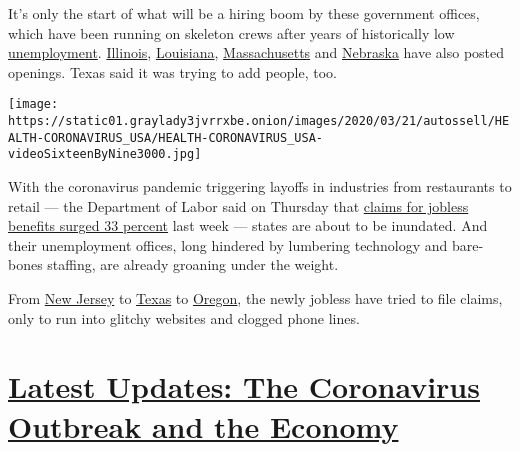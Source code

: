 It's only the start of what will be a hiring boom by these government
offices, which have been running on skeleton crews after years of
historically low
\href{https://www.nytimes3xbfgragh.onion/2020/04/03/upshot/coronavirus-jobless-rate-great-depression.html}{unemployment}.
\href{https://www.linkedin.com/jobs/view/1781957964/?eBP=NotAvailableFromVoyagerAPI\&refId=a42318c2-4f6f-4ec4-9d40-6d8e7c734cb3\&trk=d_flagship3_search_srp_jobs}{Illinois},
\href{https://www.linkedin.com/jobs/view/1781925553/?eBP=NotAvailableFromVoyagerAPI\&refId=f4bff901-d957-4d06-b4e1-ffeb31a8d5fd\&trk=d_flagship3_search_srp_jobs}{Louisiana},
\href{https://www.linkedin.com/jobs/view/1786824548/?eBP=NotAvailableFromVoyagerAPI\&refId=a42318c2-4f6f-4ec4-9d40-6d8e7c734cb3\&trk=d_flagship3_search_srp_jobs}{Massachusetts}
and
\href{https://www.linkedin.com/jobs/view/1780250882/?eBP=NotAvailableFromVoyagerAPI\&refId=eb500c71-3647-4c52-a69a-4f6c5a6bcde1\&trk=d_flagship3_search_srp_jobs}{Nebraska}
have also posted openings. Texas said it was trying to add people, too.

\texttt{[image: https://static01.graylady3jvrrxbe.onion/images/2020/03/21/autossell/HEALTH-CORONAVIRUS\_USA/HEALTH-CORONAVIRUS\_USA-videoSixteenByNine3000.jpg]}

With the coronavirus pandemic triggering layoffs in industries from
restaurants to retail --- the Department of Labor said on Thursday that
\href{https://www.dol.gov/sites/dolgov/files/OPA/newsreleases/ui-claims/20200480.pdf}{claims
for jobless benefits surged 33 percent} last week --- states are about
to be inundated. And their unemployment offices, long hindered by
lumbering technology and bare-bones staffing, are already groaning under
the weight.

From
\href{https://twitter.com/faregametravel/status/1239968403537809411}{New
Jersey} to \href{http://texas}{Texas} to \href{http://oregon}{Oregon},
the newly jobless have tried to file claims, only to run into glitchy
websites and clogged phone lines.

\hypertarget{latest-updates-the-coronavirus-outbreak-and-the-economy}{%
\section{\texorpdfstring{\href{https://www.nytimes3xbfgragh.onion/live/2020/08/17/business/stock-market-today-coronavirus?action=click\&pgtype=Article\&state=default\&region=MAIN_CONTENT_1\&context=storylines_live_updates}{Latest
Updates: The Coronavirus Outbreak and the
Economy}}{Latest Updates: The Coronavirus Outbreak and the Economy}}\label{latest-updates-the-coronavirus-outbreak-and-the-economy}}

